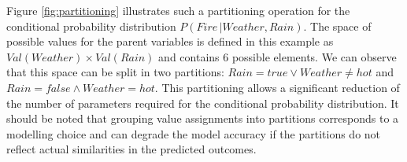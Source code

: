 Figure \ref{fig:partitioning} illustrates such a partitioning operation for the conditional probability distribution $P(\mathit{Fire} \, | \mathit{Weather}, \mathit{Rain})$.  The space of possible values for the parent variables is defined in this example as $\textit{Val}(\mathit{Weather}) \times \textit{Val}(\mathit{Rain})$ and contains 6 possible elements.  We can observe that this space can be split in two partitions: $\mathit{Rain}\!=\mathit{true} \lor \mathit{Weather}\!\neq\mathit{hot}$ and $\mathit{Rain}\!=\mathit{false} \land \mathit{Weather}\!=\mathit{hot}$. This partitioning allows a significant reduction of the number of parameters required for the conditional probability distribution.  It should be noted that grouping value assignments into partitions corresponds to a modelling choice and can degrade the model accuracy if the partitions do not reflect actual similarities in the predicted outcomes.



